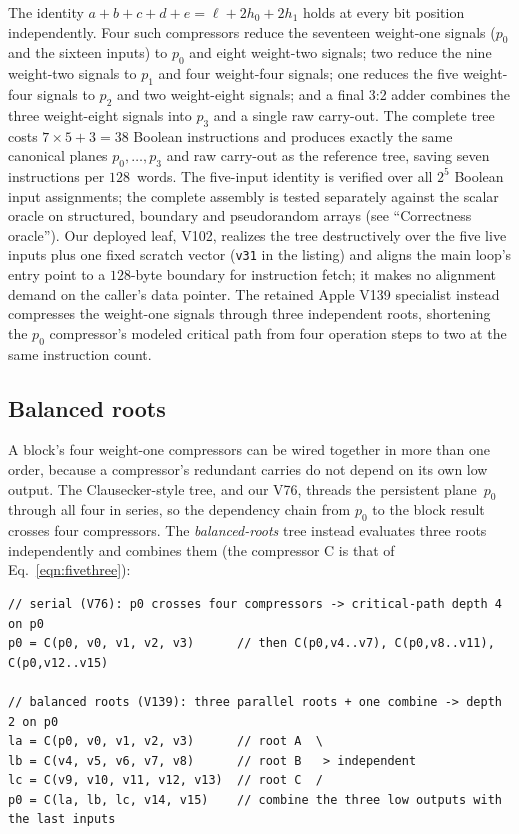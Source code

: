 \documentclass[fleqn,10pt]{wlscirep}
\begin{document}
\noindent
The identity $a+b+c+d+e=\ell+2h_0+2h_1$ holds at every bit position independently. Four such compressors reduce the seventeen weight-one signals ($p_0$ and the sixteen inputs) to $p_0$ and eight weight-two signals; two reduce the nine weight-two signals to $p_1$ and four weight-four signals; one reduces the five weight-four signals to $p_2$ and two weight-eight signals; and a final 3:2 adder combines the three weight-eight signals into $p_3$ and a single raw carry-out. The complete tree costs $7\times5+3=38$ Boolean instructions and produces exactly the same canonical planes $p_0,\dots,p_3$ and raw carry-out as the reference tree, saving seven instructions per $128$~words. The five-input identity is verified over all $2^5$ Boolean input assignments; the complete assembly is tested separately against the scalar oracle on structured, boundary and pseudorandom arrays (see ``Correctness oracle''). Our deployed leaf, V102, realizes the tree destructively over the five live inputs plus one fixed scratch vector (\texttt{v31} in the listing) and aligns the main loop's entry point to a $128$-byte boundary for instruction fetch; it makes no alignment demand on the caller's data pointer. The retained Apple V139 specialist instead compresses the weight-one signals through three independent roots, shortening the $p_0$ compressor's modeled critical path from four operation steps to two at the same instruction count.

\subsection*{Balanced roots}
A block's four weight-one compressors can be wired together in more than one order, because a compressor's redundant carries do not depend on its own low output. The Clausecker-style tree, and our V76, threads the persistent plane~$p_0$ through all four in series, so the dependency chain from $p_0$ to the block result crosses four compressors. The \emph{balanced-roots} tree instead evaluates three roots independently and combines them (the compressor $\mathrm{C}$ is that of Eq.~\ref{eqn:fivethree}):

\begin{lstlisting}[style=customc,basicstyle=\scriptsize\ttfamily,morecomment={[l]{//}}]
// serial (V76): p0 crosses four compressors -> critical-path depth 4 on p0
p0 = C(p0, v0, v1, v2, v3)      // then C(p0,v4..v7), C(p0,v8..v11), C(p0,v12..v15)

// balanced roots (V139): three parallel roots + one combine -> depth 2 on p0
la = C(p0, v0, v1, v2, v3)      // root A  \
lb = C(v4, v5, v6, v7, v8)      // root B   > independent
lc = C(v9, v10, v11, v12, v13)  // root C  /
p0 = C(la, lb, lc, v14, v15)    // combine the three low outputs with the last inputs
\end{lstlisting}
\end{document}
